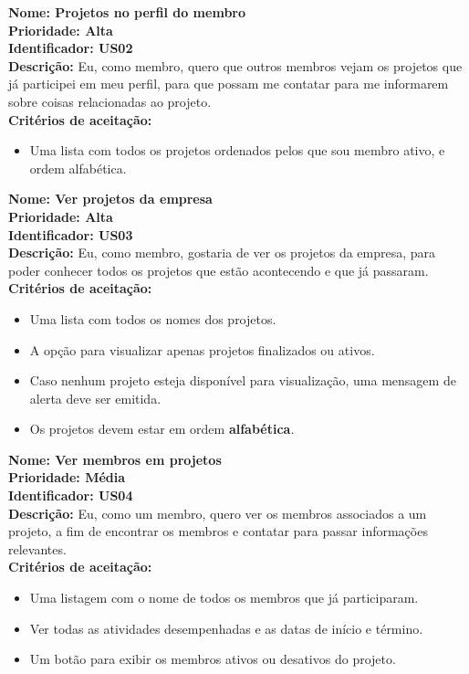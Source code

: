 \begin{anexosenv}
\textbf{Nome: Projetos no perfil do membro\\
    Prioridade: Alta\\
    Identificador: US02\\
    Descrição:} Eu, como membro, quero que outros membros vejam os projetos que já participei em meu perfil, para que possam me contatar para me informarem sobre coisas relacionadas ao projeto.\\
\textbf{Critérios de aceitação:}
\begin{itemize}
    \item Uma lista com todos os projetos ordenados pelos que sou membro ativo, e ordem alfabética.
\end{itemize}

\textbf{Nome: Ver projetos da empresa\\
    Prioridade: Alta\\
    Identificador: US03\\
    Descrição:} Eu, como membro, gostaria de ver os projetos da empresa, para poder conhecer todos os projetos que estão acontecendo e que já passaram.\\
\textbf{Critérios de aceitação:}
\begin{itemize}
    \item Uma lista com todos os nomes dos projetos.
    \item A opção para visualizar apenas projetos finalizados ou ativos.
    \item Caso nenhum projeto esteja disponível para visualização, uma mensagem de alerta deve ser emitida.
    \item Os projetos devem estar em ordem \textbf{alfabética}.
\end{itemize}

\textbf{Nome:  Ver membros em projetos\\
    Prioridade: Média\\
    Identificador: US04\\
    Descrição:} Eu, como um membro, quero ver os membros associados a um projeto, a fim de encontrar os membros e contatar para passar informações relevantes.\\
\textbf{Critérios de aceitação:}
\begin{itemize}
    \item Uma listagem com o nome de todos os membros que já participaram.
    \item Ver todas as atividades desempenhadas e as datas de início e término.
    \item Um botão para exibir os membros ativos ou desativos do projeto.
\end{itemize}


\end{anexosenv}
